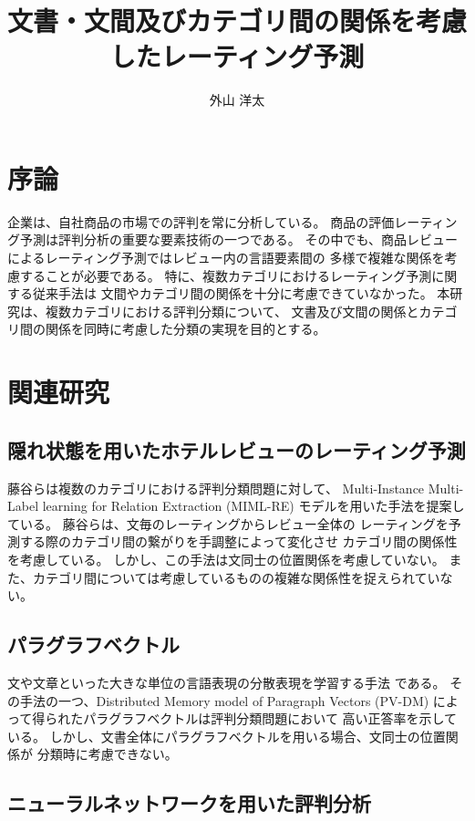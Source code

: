 \documentclass{ttisummary}
\title{文書・文間及びカテゴリ間の関係を考慮したレーティング予測}
\author{外山 洋太}
\begin{document}
\section{序論}

企業は、自社商品の市場での評判を常に分析している。
商品の評価レーティング予測は評判分析の重要な要素技術の一つである。
その中でも、商品レビューによるレーティング予測ではレビュー内の言語要素間の
多様で複雑な関係を考慮することが必要である。
特に、複数カテゴリにおけるレーティング予測に関する従来手法\cite{fujitani15}は
文間やカテゴリ間の関係を十分に考慮できていなかった。
本研究は、複数カテゴリにおける評判分類について、
文書及び文間の関係とカテゴリ間の関係を同時に考慮した分類の実現を目的とする。



\section{関連研究}

\subsection{隠れ状態を用いたホテルレビューのレーティング予測}

藤谷ら\cite{fujitani15}は複数のカテゴリにおける評判分類問題に対して、
Multi-Instance Multi-Label learning for Relation Extraction (MIML-RE)
\cite{mihai12}モデルを用いた手法を提案している。
藤谷ら\cite{fujitani15}は、文毎のレーティングからレビュー全体の
レーティングを予測する際のカテゴリ間の繋がりを手調整によって変化させ
カテゴリ間の関係性を考慮している。
しかし、この手法は文同士の位置関係を考慮していない。
また、カテゴリ間については考慮しているものの複雑な関係性を捉えられていない。


\subsection{パラグラフベクトル}

文や文章といった大きな単位の言語表現の分散表現を学習する手法\cite{quoc14}
である。
その手法の一つ、Distributed Memory model of Paragraph Vectors (PV-DM)
によって得られたパラグラフベクトルは評判分類問題において
高い正答率を示している\cite{quoc14}。
しかし、文書全体にパラグラフベクトルを用いる場合、文同士の位置関係が
分類時に考慮できない。


\subsection{ニューラルネットワークを用いた評判分析}
\end{document}
